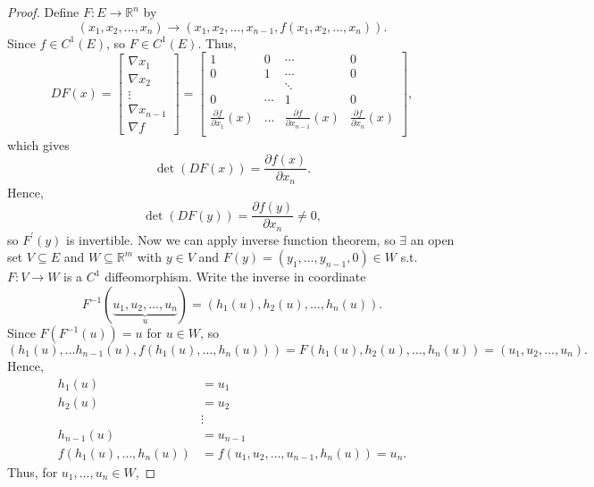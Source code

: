 \begin{proof}
    Define \(F: E \to \mathbb{R} ^n\) by 
    \[
        (x_1, x_2, \dots , x_n) \to (x_1, x_2, \dots , x_{n-1}, f(x_1, x_2, \dots , x_{n})).
    \] 
    Since \(f \in C^1(E)\), so \(F \in C^1(E)\). Thus,
    \[
        DF(x) = \begin{bmatrix}
             \nabla x_1 \\
             \nabla x_2 \\
             \vdots \\
             \nabla x_{n-1} \\
             \nabla f
        \end{bmatrix} = \begin{bmatrix}
            1 & 0 & \cdots & 0  \\
            0 & 1 & \cdots & 0  \\
             &  & \ddots &   \\
            0 & \cdots & 1 & 0  \\
            \frac{\partial f}{\partial x_1}(x)  & \dots  & \frac{\partial f}{\partial x_{n-1}}(x)  & \frac{\partial f}{\partial x_n}(x)   \\
        \end{bmatrix},
    \]  
    which gives 
    \[
        \det (DF(x)) = \frac{\partial f(x)}{\partial x_n}. 
    \]
    Hence, 
    \[
        \det (DF(y)) = \frac{\partial f (y)}{\partial x_n} \neq 0,
    \]
    so \(F^{\prime} (y)\) is invertible. Now we can apply inverse function theorem, so \(\exists \) an open set \(V \subseteq E\) and \(W \subseteq \mathbb{R} ^m\) with \(y \in V\) and \(F(y) = (y_1, \dots , y_{n-1}, 0) \in W\) s.t. \(F: V \to W\) is a \(C^1\) diffeomorphism. Write the inverse in coordinate
    \[
        F^{-1}( \underbrace{u_1, u_2, \dots , u_n}_{u} )  = (h_1(u), h_2(u), \dots , h_n(u)).
    \] 
    Since \(F(F^{-1}(u)) = u\) for \(u \in W\), so 
    \[
        (h_1(u), \dots h_{n-1}(u), f(h_1(u), \dots , h_n(u))) = F(h_1(u), h_2(u), \dots , h_n(u)) = (u_1, u_2, \dots, u_n).
    \]
    Hence,
    \begin{align*}
        h_1(u) &= u_1 \\
        h_2(u) &= u_2 \\
        &\vdots \\
        h_{n-1}(u) &= u_{n-1}\\
        f(h_1(u), \dots , h_n(u)) &= f(u_1, u_2, \dots , u_{n-1}, h_n(u)) = u_n.
    \end{align*} 
    Thus, for \(u_1, \dots , u_n \in W\), 

\end{proof}
